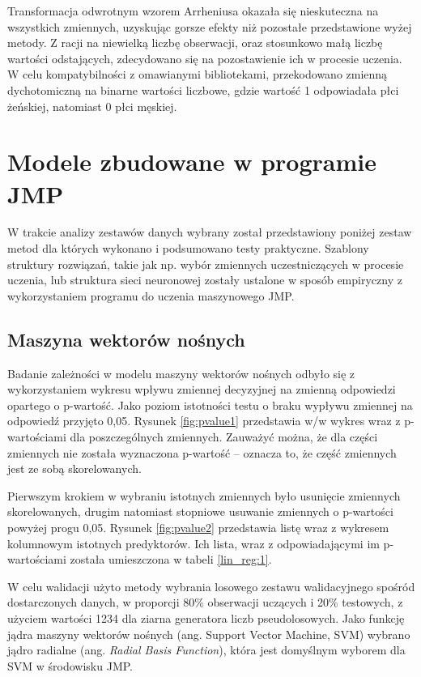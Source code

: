 	Transformacja odwrotnym wzorem Arrheniusa okazała się nieskuteczna na wszystkich zmiennych, uzyskując gorsze efekty niż pozostałe przedstawione wyżej metody. Z racji na niewielką liczbę obserwacji, oraz stosunkowo małą liczbę wartości odstających, zdecydowano się na pozostawienie ich w procesie uczenia. W celu kompatybilności z omawianymi bibliotekami, przekodowano zmienną dychotomiczną na binarne wartości liczbowe, gdzie wartość 1 odpowiadała płci żeńskiej, natomiast 0 płci męskiej.

\section{Modele zbudowane w programie JMP}

W trakcie analizy zestawów danych wybrany został przedstawiony poniżej zestaw metod dla których wykonano i podsumowano testy praktyczne. Szablony struktury rozwiązań, takie jak np. wybór zmiennych uczestniczących w procesie uczenia, lub struktura sieci neuronowej zostały ustalone w sposób empiryczny z wykorzystaniem programu do uczenia maszynowego JMP. 




\subsection{Maszyna wektorów nośnych}

Badanie zależności w modelu maszyny wektorów nośnych odbyło się z wykorzystaniem wykresu wpływu zmiennej decyzyjnej na zmienną odpowiedzi opartego o p-wartość. Jako poziom istotności testu o braku wypływu zmiennej na odpowiedź przyjęto 0,05. Rysunek \ref{fig:pvalue1} przedstawia w/w wykres wraz z p-wartościami dla poszczególnych zmiennych. Zauważyć można, że dla części zmiennych nie została wyznaczona p-wartość -- oznacza to, że część zmiennych jest ze sobą skorelowanych.

Pierwszym krokiem w wybraniu istotnych zmiennych było usunięcie zmiennych skorelowanych, drugim natomiast stopniowe usuwanie zmiennych o p-wartości powyżej progu 0,05. Rysunek \ref{fig:pvalue2} przedstawia listę wraz z wykresem kolumnowym istotnych predyktorów. Ich lista, wraz z odpowiadającymi im p-wartościami została umieszczona w tabeli \ref{lin_reg:1}.

W celu walidacji użyto metody wybrania losowego zestawu walidacyjnego spośród dostarczonych danych, w proporcji 80\% obserwacji uczących i 20\% testowych, z użyciem wartości 1234 dla ziarna generatora liczb pseudolosowych. Jako funkcję jądra maszyny wektorów nośnych (ang. Support Vector Machine, SVM) wybrano jądro radialne (ang. \textit{Radial Basis Function}), która jest domyślnym wyborem dla SVM w środowisku JMP. 

